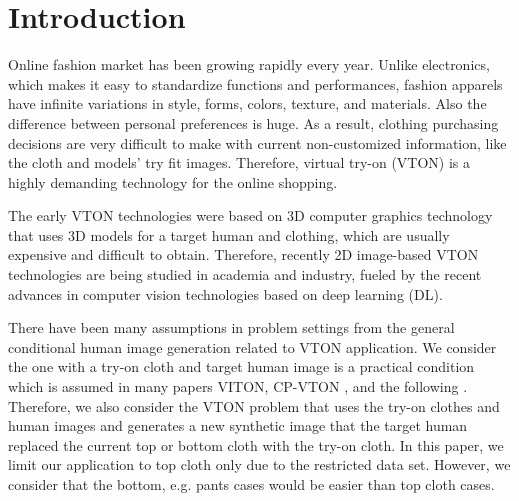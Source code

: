 \section{Introduction}


Online fashion market has been growing rapidly every year. Unlike electronics, which makes it easy to standardize functions and performances, fashion apparels have infinite variations in style, forms, colors, texture, and materials.  Also the difference between personal preferences is huge. As a result, clothing purchasing decisions are very difficult to make with current non-customized information, like the cloth and models' try fit images. Therefore, virtual try-on (VTON) is a highly demanding technology for the online shopping. 

The early VTON technologies were based on 3D computer graphics technology that uses 3D models for a target human and clothing, which are usually expensive and difficult to obtain. Therefore, recently 2D image-based VTON technologies are being studied in academia and industry, fueled by the recent advances in computer vision technologies based on deep learning (DL). 

There have been many assumptions in problem settings from the general conditional human image generation related to VTON application. We consider the one with a try-on cloth and target human image is a practical condition which is assumed in many papers VITON\cite{Han2017VITONAI}, CP-VTON\cite{Wang2018TowardCI} , and the following  \cite{Sun2019ImageBasedVT,Yu_2019_ICCV}. Therefore, we also consider the VTON problem that uses the try-on clothes and human images and generates a new synthetic image that the target human replaced the current top or bottom cloth with the try-on cloth. In this paper, we limit our application to top cloth only due to the restricted data set. However, we consider that the bottom, e.g. pants cases would be easier than top cloth cases.

